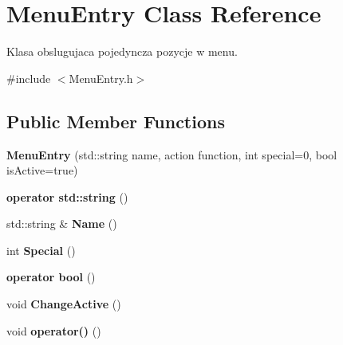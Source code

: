 \hypertarget{class_menu_entry}{}\section{Menu\+Entry Class Reference}
\label{class_menu_entry}


Klasa obslugujaca pojedyncza pozycje w menu.  




{\ttfamily \#include $<$Menu\+Entry.\+h$>$}

\subsection*{Public Member Functions}
\begin{DoxyCompactItemize}
\item 
\hypertarget{class_menu_entry_a400100dee10c9aab7af558f854120fbd}{}{\bfseries Menu\+Entry} (std\+::string name, action function, int special=0, bool is\+Active=true)\label{class_menu_entry_a400100dee10c9aab7af558f854120fbd}

\item 
\hypertarget{class_menu_entry_a8314e960e8670d18d703984b49aa1675}{}{\bfseries operator std\+::string} ()\label{class_menu_entry_a8314e960e8670d18d703984b49aa1675}

\item 
\hypertarget{class_menu_entry_a94ce04cb1d1a97506416ab206665ed22}{}std\+::string \& {\bfseries Name} ()\label{class_menu_entry_a94ce04cb1d1a97506416ab206665ed22}

\item 
\hypertarget{class_menu_entry_a8c3eb591798f523d010c21cbf8f2d6f7}{}int {\bfseries Special} ()\label{class_menu_entry_a8c3eb591798f523d010c21cbf8f2d6f7}

\item 
\hypertarget{class_menu_entry_adb576d6c52b0065a9a3e0f200799ab19}{}{\bfseries operator bool} ()\label{class_menu_entry_adb576d6c52b0065a9a3e0f200799ab19}

\item 
\hypertarget{class_menu_entry_a2e8401a0092bd024580cd4f3c17820f9}{}void {\bfseries Change\+Active} ()\label{class_menu_entry_a2e8401a0092bd024580cd4f3c17820f9}

\item 
\hypertarget{class_menu_entry_a885d1c55d01b54a3071b477ff142a678}{}void {\bfseries operator()} ()\label{class_menu_entry_a885d1c55d01b54a3071b477ff142a678}

\end{DoxyCompactItemize}


